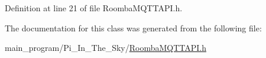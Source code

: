 Definition at line 21 of file Roomba\+M\+Q\+T\+T\+A\+P\+I.\+h.



The documentation for this class was generated from the following file\+:\begin{DoxyCompactItemize}
\item 
main\+\_\+program/\+Pi\+\_\+\+In\+\_\+\+The\+\_\+\+Sky/\hyperlink{_roomba_m_q_t_t_a_p_i_8h}{Roomba\+M\+Q\+T\+T\+A\+P\+I.\+h}\end{DoxyCompactItemize}
